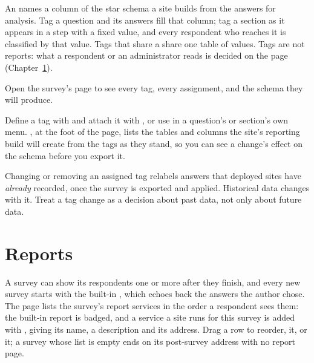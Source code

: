 \documentclass[11pt, a4paper]{article}
\begin{document}
An  names a column of the star schema a site builds from the answers for
analysis. Tag a question and its answers fill that column; tag a section as it appears in a step
with a fixed value, and every respondent who reaches it is classified by that value. Tags that
share a  share one table of values. Tags are not reports: what a respondent or an
administrator reads is decided on the  page (Chapter~\ref{sec:reports}).

Open the survey's  page to see every tag, every assignment, and the schema they
will produce.


Define a tag with  and attach it with , or use 
in a question's or section's own menu. , at the foot of the page, lists
the tables and columns the site's reporting build will create from the tags as they stand, so you
can see a change's effect on the schema before you export it.


\begin{elicitcaution}
Changing or removing an assigned tag relabels answers that deployed sites have \emph{already}
recorded, once the survey is exported and applied. Historical data changes with it. Treat a
tag change as a decision about past data, not only about future data.
\end{elicitcaution}

\section{Reports}
\label{sec:reports}

A survey can show its respondents one or more  after they finish, and every new
survey starts with the built-in , which echoes back the answers the
author chose. The  page lists the survey's report services in the order a
respondent sees them: the built-in report is badged, and a service a site runs for this survey
is added with , giving its name, a description and its address. Drag a
row to reorder,  it, or  it; a survey whose list is empty ends on its
post-survey address with no report page.
\end{document}
